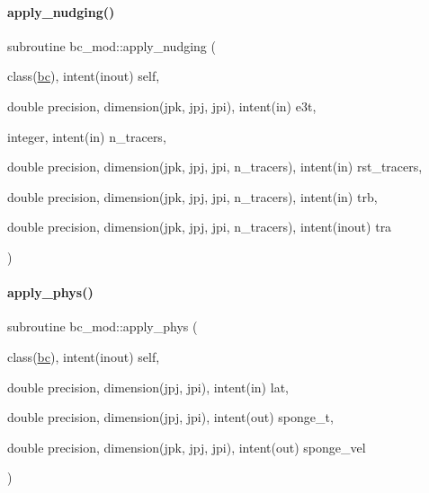 \paragraph{\texorpdfstring{apply\+\_\+nudging()}{apply\_nudging()}}
{\footnotesize\ttfamily subroutine bc\+\_\+mod\+::apply\+\_\+nudging (\begin{DoxyParamCaption}\item[{class(\mbox{\hyperlink{structbc__mod_1_1bc}{bc}}), intent(inout)}]{self,  }\item[{double precision, dimension(jpk, jpj, jpi), intent(in)}]{e3t,  }\item[{integer, intent(in)}]{n\+\_\+tracers,  }\item[{double precision, dimension(jpk, jpj, jpi, n\+\_\+tracers), intent(in)}]{rst\+\_\+tracers,  }\item[{double precision, dimension(jpk, jpj, jpi, n\+\_\+tracers), intent(in)}]{trb,  }\item[{double precision, dimension(jpk, jpj, jpi, n\+\_\+tracers), intent(inout)}]{tra }\end{DoxyParamCaption})}

\mbox{\label{namespacebc__mod_ac83f910c3a8db513c1a4952f650b279c}} 
\paragraph{\texorpdfstring{apply\+\_\+phys()}{apply\_phys()}}
{\footnotesize\ttfamily subroutine bc\+\_\+mod\+::apply\+\_\+phys (\begin{DoxyParamCaption}\item[{class(\mbox{\hyperlink{structbc__mod_1_1bc}{bc}}), intent(inout)}]{self,  }\item[{double precision, dimension(jpj, jpi), intent(in)}]{lat,  }\item[{double precision, dimension(jpj, jpi), intent(out)}]{sponge\+\_\+t,  }\item[{double precision, dimension(jpk, jpj, jpi), intent(out)}]{sponge\+\_\+vel }\end{DoxyParamCaption})}

\mbox{\label{namespacebc__mod_a67873e29b428f5525f9cb12426dafa43}} 
